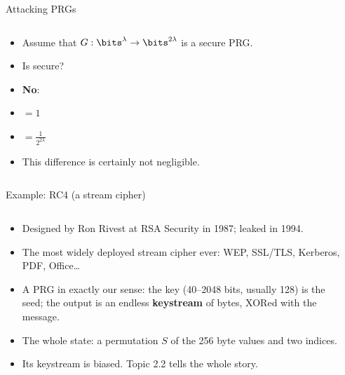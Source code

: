 \ifdefined\PRESENTATION\else\PassOptionsToClass{handout}{beamer}\fi\documentclass[aspectratio=169, lualatex]{beamer}
\begin{document}
\begin{frame}{Attacking PRGs}
	\begin{columns}[c]
		\begin{column}{0.45\textwidth}
			\begin{itemize}
				\item<1-2> Assume that $G: \bits^\lambda \rightarrow \bits^{2\lambda}$ is a secure PRG.
				\item<1-2> Is  secure?
				\item<1-2> \textbf{No}:
				\item<1-2>  $ = 1$
				\item<2-2>  $ = \frac{1}{2^{2\lambda}}$
				\item<2-2> This difference is certainly not negligible.
			\end{itemize}
		\end{column}
		\begin{column}{0.55\textwidth}
			\begin{flushright}
			\end{flushright}
		\end{column}
	\end{columns}
\end{frame}

\begin{frame}{Example: RC4 (a stream cipher)}
	\begin{columns}[c]
		\begin{column}{0.6\textwidth}
			\begin{itemize}
				\item Designed by Ron Rivest at RSA Security in 1987; leaked in 1994.
				\item The most widely deployed stream cipher ever: WEP, SSL/TLS, Kerberos, PDF, Office\ldots
				\item A PRG in exactly our sense: the key (40--2048 bits, usually 128) is the seed; the output is an endless \textbf{keystream} of bytes, XORed with the message.
				\item The whole state: a permutation $S$ of the 256 byte values and two indices.
				\item Its keystream is biased. Topic 2.2 tells the whole story.
			\end{itemize}
		\end{column}
		\begin{column}{0.4\textwidth}
		\end{column}
	\end{columns}
\end{frame}
\end{document}
